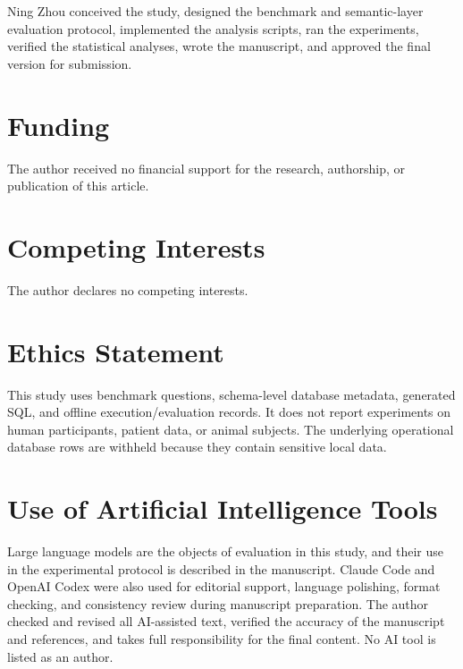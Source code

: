 \documentclass[11pt]{article}
\begin{document}
Ning Zhou conceived the study, designed the benchmark and semantic-layer
evaluation protocol, implemented the analysis scripts, ran the experiments,
verified the statistical analyses, wrote the manuscript, and approved the final
version for submission.

\section*{Funding}

The author received no financial support for the research, authorship, or
publication of this article.

\section*{Competing Interests}

The author declares no competing interests.

\section*{Ethics Statement}

This study uses benchmark questions, schema-level database metadata, generated
SQL, and offline execution/evaluation records. It does not report experiments on
human participants, patient data, or animal subjects. The underlying operational
database rows are withheld because they contain sensitive local data.

\section*{Use of Artificial Intelligence Tools}

Large language models are the objects of evaluation in this study, and their use
in the experimental protocol is described in the manuscript. Claude Code and
OpenAI Codex were also used for editorial support, language polishing, format
checking, and consistency review during manuscript preparation. The author
checked and revised all AI-assisted text, verified the accuracy of the
manuscript and references, and takes full responsibility for the final content.
No AI tool is listed as an author.
\end{document}
